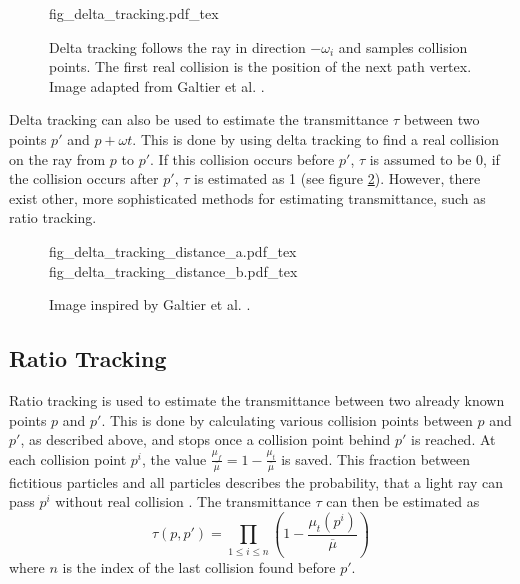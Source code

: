\begin{figure}
\centering
\def\svgwidth{\columnwidth}
{fig_delta_tracking.pdf_tex}

\caption{Delta tracking follows the ray in direction $-\omega_i$ and samples collision points. The first real collision is the position of the next path vertex. Image adapted from Galtier et al. \cite{GALTIER201357}.}
\label{fig:delta_tracking}
\end{figure}


Delta tracking can also be used to estimate the transmittance $\tau$ between two points $p'$ and $p + \omega t$\cite{10.1145/2661229.2661292}. This is done by using delta tracking to find a real collision on the ray from $p$ to $p'$. If this collision occurs before $p'$, $\tau$ is assumed to be 0, if the collision occurs after $p'$, $\tau$ is estimated as 1 (see figure \ref{fig:delta_tracking_distance}). However, there exist other, more sophisticated methods for estimating transmittance, such as ratio tracking.

\begin{figure}

\fontsize{7}{9}\selectfont
    \def\svgwidth{.48\columnwidth}
    {fig_delta_tracking_distance_a.pdf_tex}
    \hfill
    \def\svgwidth{.48\columnwidth}
    {fig_delta_tracking_distance_b.pdf_tex}


\caption{Image inspired by Galtier et al. \cite{GALTIER201357}.} \label{fig:delta_tracking_distance}
\end{figure}


\subsection{Ratio Tracking}
Ratio tracking \cite{10.1145/2661229.2661292} is used to estimate the transmittance between two already known points $p$ and $p'$. This is done by calculating various collision points between $p$ and $p'$, as described above, and stops once a collision point behind $p'$ is reached. At each collision point $p^i$, the value $\frac{\mu_f}{\overline{\mu}} = 1 - \frac{\mu_t}{\overline{\mu}}$ is saved. This fraction between fictitious particles and all particles describes the probability, that a light ray can pass $p^i$ without real collision \cite{10.1145/2661229.2661292}. The transmittance $\tau$ can then be estimated as 
\begin{equation}
\tau(p,p') = \prod_{1 \le i \le n}(1 - \frac{\mu_t(p^i)}{\overline{\mu}})
\end{equation}
where $n$ is the index of the last collision found before $p'$.
